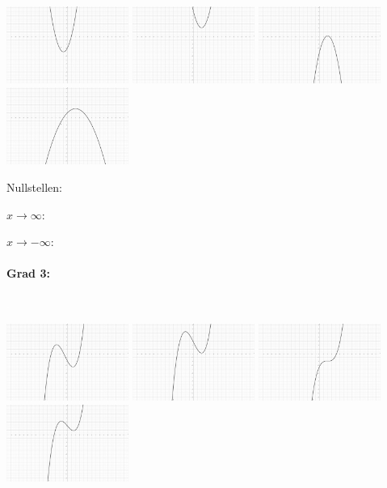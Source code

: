 \documentclass[12pt, parskip=half, a4paper, oneside]{scrartcl}
\begin{document}
\includegraphics[width=4cm]{Bilder/G21}\hfill
\includegraphics[width=4cm]{Bilder/G22}\hfill
\includegraphics[width=4cm]{Bilder/G23}\hfill
\includegraphics[width=4cm]{Bilder/G24}

\begin{addmargin}[-2cm]{0pt}
Nullstellen:

$x\rightarrow\infty:$

$x\rightarrow-\infty:$
\end{addmargin}

\paragraph{Grad 3:}\textcolor{white}{.}

\includegraphics[width=4cm]{Bilder/G31}\hfill
\includegraphics[width=4cm]{Bilder/G32}\hfill
\includegraphics[width=4cm]{Bilder/G33}\hfill
\includegraphics[width=4cm]{Bilder/G34}
\end{document}
